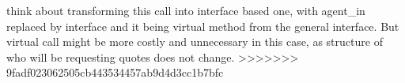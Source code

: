 \begin{DoxyRefList}
\item[\label{_dev_stage2__DevStage2000011}%
\hypertarget{_dev_stage2__DevStage2000011}{}%
Member \hyperlink{classsolar__core_1_1_s_e_i_ad532ca9d30d5988e051b75e33ce6c241}{solar\+\_\+core\+:\+:S\+E\+I\+:\+:form\+\_\+online\+\_\+quote} (std\+::shared\+\_\+ptr$<$ P\+V\+Project $>$ project\+\_\+)]think about transforming this call into interface based one, with agent\+\_\+in replaced by interface and it being virtual method from the general interface. But virtual call might be more costly and unnecessary in this case, as structure of who will be requesting quotes does not change. 
>>>>>>> 9fadf023062505cb443534457ab9d4d3cc1b7bfc
\end{DoxyRefList}
